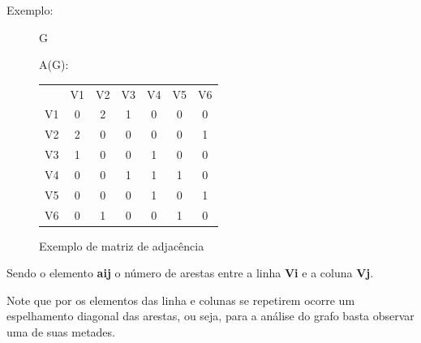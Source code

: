 \documentclass[a4paper, 12pt]{article}
\begin{document}
    \vspace{0.5in}
    
    \pagebreak
    
    Exemplo:
    
    \begin{figure}[hbt!]
        \begin{multicols}{2}
            \begin{center}
            G\:
            \end{center}
            
            A(G):
            \begin{tabular}{ccccccc}
                    & V1 & V2 & V3 & V4 & V5 & V6 \\
                    V1 & 0  & 2  & 1  & 0  & 0  & 0  \\
                    V2 & 2  & 0  & 0  & 0  & 0  & 1  \\
                    V3 & 1  & 0  & 0  & 1  & 0  & 0  \\
                    V4 & 0  & 0  & 1  & 1  & 1  & 0  \\
                    V5 & 0  & 0  & 0  & 1  & 0  & 1  \\
                    V6 & 0  & 1  & 0  & 0  & 1  & 0 
            \end{tabular}
        \end{multicols}
        \caption{Exemplo de matriz de adjacência}
    \end{figure}
    
    \vspace{0.5in}
    
    Sendo o elemento \textbf{aij} o número de arestas entre a linha \textbf{Vi} e a coluna \textbf{Vj}. 
    
    \indent Note que por os elementos das linha e colunas se repetirem ocorre um espelhamento diagonal das arestas, ou seja, para a análise do grafo basta observar uma de suas metades. 
\end{document}
